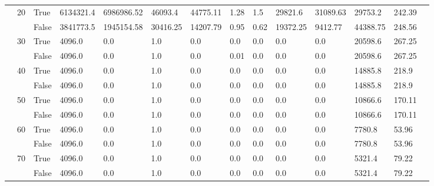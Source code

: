 \begin{landscape}
\begin{small}
\begin{longtable}[c]{@{}lll|ll|ll|ll|ll|lll@{}}
   & 20 & True  & 6134321.4       & 6986986.52     & 46093.4       & 44775.11      & 1.28          & 1.5           & 29821.6       & 31089.63      & 29753.2       & 242.39      &  \\
   &    & False & 3841773.5       & 1945154.58     & 30416.25      & 14207.79      & 0.95          & 0.62          & 19372.25      & 9412.77       & 44388.75      & 248.56      &  \\
   & 30 & True  & 4096.0          & 0.0            & 1.0           & 0.0           & 0.0           & 0.0           & 0.0           & 0.0           & 20598.6       & 267.25      &  \\
   &    & False & 4096.0          & 0.0            & 1.0           & 0.0           & 0.01          & 0.0           & 0.0           & 0.0           & 20598.6       & 267.25      &  \\
   & 40 & True  & 4096.0          & 0.0            & 1.0           & 0.0           & 0.0           & 0.0           & 0.0           & 0.0           & 14885.8       & 218.9       &  \\
   &    & False & 4096.0          & 0.0            & 1.0           & 0.0           & 0.0           & 0.0           & 0.0           & 0.0           & 14885.8       & 218.9       &  \\
   & 50 & True  & 4096.0          & 0.0            & 1.0           & 0.0           & 0.0           & 0.0           & 0.0           & 0.0           & 10866.6       & 170.11      &  \\
   &    & False & 4096.0          & 0.0            & 1.0           & 0.0           & 0.0           & 0.0           & 0.0           & 0.0           & 10866.6       & 170.11      &  \\
   & 60 & True  & 4096.0          & 0.0            & 1.0           & 0.0           & 0.0           & 0.0           & 0.0           & 0.0           & 7780.8        & 53.96       &  \\
   &    & False & 4096.0          & 0.0            & 1.0           & 0.0           & 0.0           & 0.0           & 0.0           & 0.0           & 7780.8        & 53.96       &  \\
   & 70 & True  & 4096.0          & 0.0            & 1.0           & 0.0           & 0.0           & 0.0           & 0.0           & 0.0           & 5321.4        & 79.22       &  \\
   &    & False & 4096.0          & 0.0            & 1.0           & 0.0           & 0.0           & 0.0           & 0.0           & 0.0           & 5321.4        & 79.22       &  \\

\end{longtable}
\end{small}
\end{landscape}
